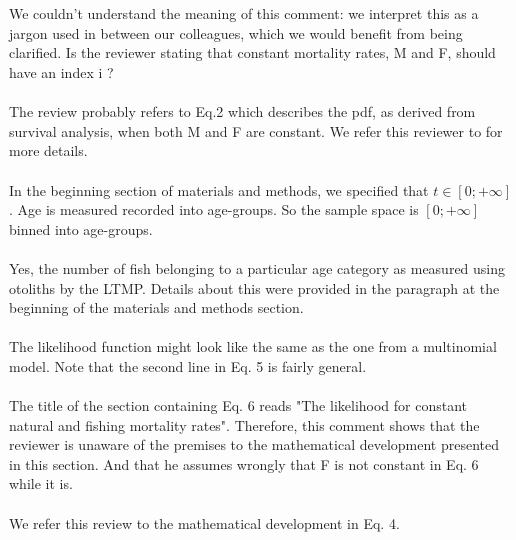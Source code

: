 \documentclass[11pt]{article}
\begin{document}
\begin{spacing}{1.2}
 \\

\\
We couldn't understand the meaning of this comment: we interpret this as a jargon used in between our colleagues, which we would benefit from being clarified. Is the reviewer stating that constant mortality rates, M and F, should have an index i ?\\

\\
The review probably refers to Eq.2 which describes the pdf, as derived from survival analysis, when both M and F are constant. We refer this reviewer to \cite{cox84b} for more details.\\

 \\
In the beginning section of materials and methods, we specified that $t \in [0;+\infty]$. Age is measured recorded into age-groups. So the sample space is $[0;+\infty]$ binned into age-groups.\\

\\
Yes, the number of fish belonging to a particular age category as measured using otoliths by the LTMP. Details about this were provided in the paragraph at the beginning of the materials and methods section.\\

\\
The likelihood function might look like the same as the one from a multinomial model. Note that the second line in Eq. 5 is fairly general. \\

 \\
The title of the section containing Eq. 6 reads "The likelihood for constant natural and fishing mortality rates". Therefore, this comment shows that the reviewer is unaware of the premises to the mathematical development presented in this section. And that he assumes wrongly that F is not constant in Eq. 6 while it is. \\

 \\
We refer this review to the mathematical development in Eq. 4. \\


\end{spacing}
\end{document}
